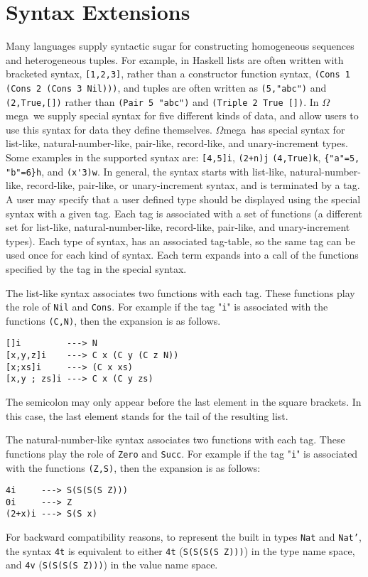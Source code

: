 \documentclass[11pt,twoside]{article}
\newcommand{\om}{$\Omega$mega}
\begin{document}
\section{Syntax Extensions} \label{synext}

Many languages supply syntactic sugar for constructing homogeneous sequences and
heterogeneous tuples. For example, in Haskell lists are often
written with bracketed syntax, \verb+[1,2,3]+, rather than a constructor function syntax, \verb+(Cons 1 (Cons 2 (Cons 3 Nil)))+, and
tuples are often written as \verb+(5,"abc")+ and \verb+(2,True,[])+
rather than \verb+(Pair 5 "abc")+ and \verb+(Triple 2 True [])+. In \om\
we supply special syntax for five different kinds of data, and allow users to
use this syntax for data they define themselves. \om\ has
special syntax for list-like, natural-number-like, pair-like, record-like, and unary-increment types.
Some examples in the supported syntax are: \verb+[4,5]i+, \verb|(2+n)j|
\verb+(4,True)k+, \verb+{"a"=5, "b"=6}h+, and \verb+(x'3)w+. In general, the syntax starts 
with list-like, natural-number-like, record-like, pair-like, or unary-increment syntax,
and is terminated by a tag. A user may specify that 
a user defined type should be displayed using the special syntax with a given tag. Each
tag is associated with a set of functions (a different set for
list-like, natural-number-like, record-like, pair-like, and unary-increment types). 
Each type of syntax, has an associated tag-table, so the same tag can be used once for
each kind of syntax. Each
term expands into a call of the functions specified by the tag
in the special syntax.

The list-like syntax associates two functions with each
tag. These functions play the role of {\tt Nil} and {\tt Cons}.
For example if the tag "{\tt i}" is associated with
the functions {\tt (C,N)}, then the expansion is as follows.
\begin{verbatim}
[]i         ---> N
[x,y,z]i    ---> C x (C y (C z N))
[x;xs]i     ---> (C x xs)
[x,y ; zs]i ---> C x (C y zs)
\end{verbatim}
\noindent
The semicolon may only appear before the last element in the square brackets.
In this case, the last element stands for the tail of the resulting list.

The natural-number-like syntax associates two functions with each
tag. These functions play the role of {\tt Zero} and {\tt Succ}.
For example if the tag "{\tt i}" is associated with
the functions {\tt (Z,S)}, then the expansion is as follows:
\begin{verbatim}
4i     ---> S(S(S(S Z)))
0i     ---> Z
(2+x)i ---> S(S x)
\end{verbatim}
For backward compatibility reasons, to represent the
built in types {\tt Nat} and {\tt Nat'}, the syntax \verb+4t+ is equivalent
to either \verb+4t+ ({\tt  S(S(S(S Z)))}) in the type name space, and \verb+4v+ 
({\tt  S(S(S(S Z)))}) in the value name space.
\end{document}
